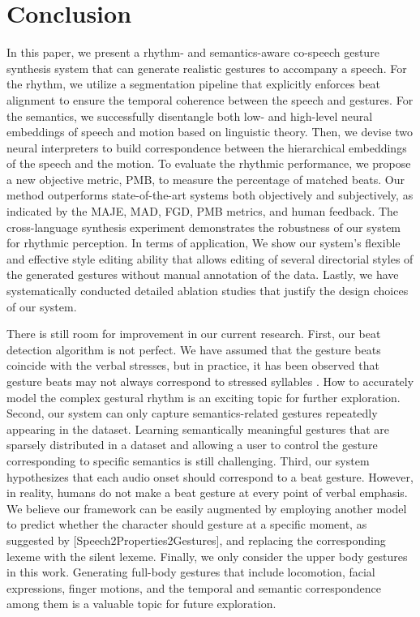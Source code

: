 \section{Conclusion}
\label{sec:conclusion}
In this paper, we present a rhythm- and semantics-aware co-speech gesture synthesis system that can generate realistic gestures to accompany a speech.  For the rhythm, we utilize a segmentation pipeline that explicitly enforces beat alignment to ensure the temporal coherence between the speech and gestures. For the semantics, we successfully disentangle both low- and high-level neural embeddings of speech and motion based on linguistic theory. Then, we devise two neural interpreters to build correspondence between the hierarchical embeddings of the speech and the motion. To evaluate the rhythmic performance, we propose a new objective metric, PMB, to measure the percentage of matched beats. Our method outperforms state-of-the-art systems both objectively and subjectively, as indicated by the MAJE, MAD, FGD, PMB metrics, and human feedback. The cross-language synthesis experiment demonstrates the robustness of our system for rhythmic perception. In terms of application, We show our system's flexible and effective style editing ability that allows editing of several directorial styles of the generated gestures without manual annotation of the data. Lastly, we have systematically conducted detailed ablation studies that justify the design choices of our system.

There is still room for improvement in our current research. 
First, our beat detection algorithm is not perfect. We have assumed that the gesture beats coincide with the verbal stresses, but in practice, it has been observed that gesture beats may not always correspond to stressed syllables \cite{mcclave1994gestural}. 
How to accurately model the complex gestural rhythm is an exciting topic for further exploration.
Second, our system can only capture semantics-related gestures repeatedly appearing in the dataset. Learning semantically meaningful gestures that are sparsely distributed in a dataset and allowing a user to control the gesture corresponding to specific semantics is still challenging.
Third, our system hypothesizes that each audio onset should correspond to a beat gesture. However, in reality, humans do not make a beat gesture at every point of verbal emphasis. We believe our framework can be easily augmented by employing another model to predict whether the character should gesture at a specific moment, as suggested by [Speech2Properties2Gestures], and replacing the corresponding lexeme with the silent lexeme.
Finally, we only consider the upper body gestures in this work. Generating full-body gestures that include locomotion, facial expressions, finger motions, and the temporal and semantic correspondence among them is a valuable topic for future exploration.